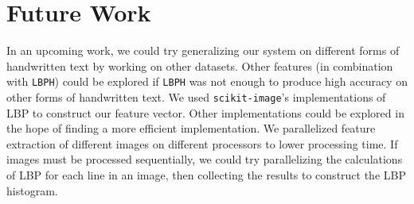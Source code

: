 \section{Future Work}
In an upcoming work, we could try generalizing our system on different forms of handwritten text by working on other datasets. Other features (in combination with \texttt{LBPH}) could be explored if \texttt{LBPH} was not enough to produce high accuracy on other forms of handwritten text. We used \texttt{scikit-image}'s implementations of LBP to construct our feature vector. Other implementations could be explored in the hope of finding a more efficient implementation. We parallelized feature extraction of different images on different processors to lower processing time. If images must be processed sequentially, we could try parallelizing the calculations of LBP for each line in an image, then collecting the results to construct the LBP histogram.